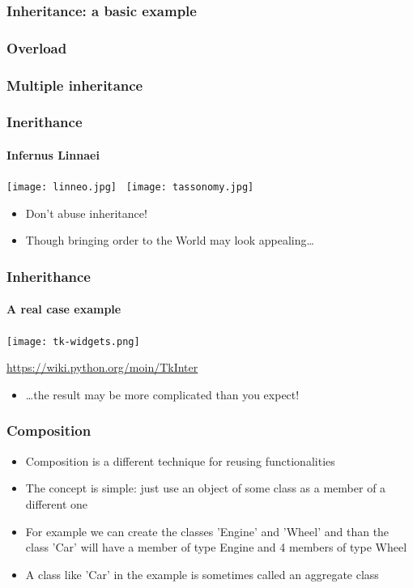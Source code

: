 \documentclass[9pt]{beamer}
\begin{document}
\begin{frame}
  \frametitle{Inheritance: a basic example}
  
\end{frame}


\begin{frame}
  \frametitle{Overload}
  
\end{frame}


\begin{frame}
  \frametitle{Multiple inheritance}
  
\end{frame}


\begin{frame}
  \frametitle{Inerithance}
  \framesubtitle{Infernus Linnaei}
  
  \centering
  \texttt{[image: linneo.jpg]}~\quad%
  \texttt{[image: tassonomy.jpg]}
  
  \bigskip
    
  \begin{itemize}
    \item Don't abuse inheritance!
    \medskip
    \item Though bringing order to the World may look appealing\dots
  \end{itemize}
  
\end{frame}


\begin{frame}
  \frametitle{Inherithance}
  \framesubtitle{A real case example}
  
  \centering
  \texttt{[image: tk-widgets.png]}
   
  \tiny \url{https://wiki.python.org/moin/TkInter} \normalsize
    
  \smallskip
  \begin{itemize}
    \item {\dots}the result may be more complicated than you expect!
  \end{itemize}
\end{frame}


\begin{frame}
  \frametitle{Composition}
    
  \begin{itemize}
    \item \alert{Composition} is a different technique for reusing functionalities
    \medskip
    \item The concept is simple: just use an object of some class as a member of
          a different one
    \medskip
    \item For example we can create the classes 'Engine' and 'Wheel' and than 
          the class 'Car' will have a member of type Engine and 4 members of
          type Wheel
    \medskip
    \item A class like 'Car' in the example is sometimes called an 
          \alert{aggregate} class
  \end{itemize}
  
\end{frame}
\end{document}
